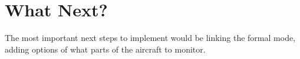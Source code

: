 \documentclass[../dissertation.tex]{subfiles}
\begin{document}
\section{What Next?}
The most important next steps to implement would be
linking the formal mode, adding options of what parts of the aircraft
to monitor.
\end{document}
